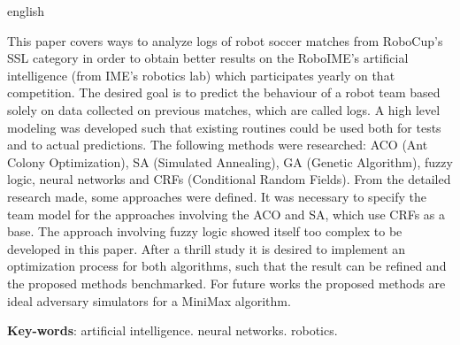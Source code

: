 \documentclass[
	12pt,				%
	oneside,			%
	a4paper,			%
	english,			%
	brazil,				%
	]{ime-abntex2}
\begin{document}
\begin{resumo}[Abstract]
\begin{otherlanguage*}{english}


This paper covers ways to analyze logs of robot soccer matches from
RoboCup's SSL category in order to obtain better results on the
RoboIME's artificial intelligence (from IME's robotics lab) which
participates yearly on that competition.  The desired goal is to
predict the behaviour of a robot team based solely on data collected
on previous matches, which are called logs.  A high level modeling was
developed such that existing routines could be used both for tests and
to actual predictions.  The following methods were researched: ACO
(Ant Colony Optimization), SA (Simulated Annealing), GA (Genetic
Algorithm), fuzzy logic, neural networks and CRFs (Conditional Random
Fields).  From the detailed research made, some approaches were
defined.  It was necessary to specify the team model for the
approaches involving the ACO and SA, which use CRFs as a base.  The
approach involving fuzzy logic showed itself too complex to be
developed in this paper.  After a thrill study it is desired to
implement an optimization process for both algorithms, such that the
result can be refined and the proposed methods benchmarked.  For
future works the proposed methods are ideal adversary simulators for a
MiniMax algorithm.


\textbf{Key-words}: artificial intelligence. neural networks. robotics.
\end{otherlanguage*}
\end{resumo}

% 

%  
\end{document}
